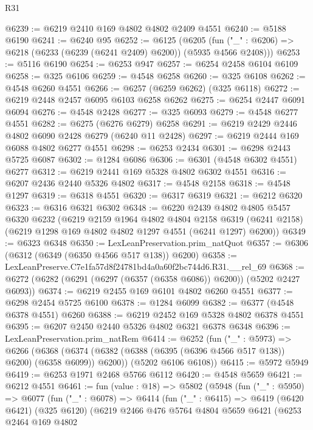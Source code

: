 \begin{lexlean}{R31}
\begin{coremodule}
@6239 := @6219 @2410 @169 @4802 @4802 @2409 @4551
@6240 := @5188 @6190
@6241 := @6240 @95
@6252 := @6125
    (@6205 (fun ("_" : @6206) => @6218 (@6233 (@6239 (@6241 @2409) @6200)) (@5935 @4566 @2408)))
@6253 := @5116 @6190
@6254 := @6253 @947
@6257 := @6254 @2458 @6104 @6109
@6258 := @325 @6106
@6259 := @4548 @6258
@6260 := @325 @6108
@6262 := @4548 @6260 @4551
@6266 := @6257 (@6259 @6262) (@325 @6118)
@6272 := @6219 @2448 @2457 @6095 @6103 @6258 @6262
@6275 := @6254 @2447 @6091 @6094
@6276 := @4548 @2428
@6277 := @325 @6093
@6279 := @4548 @6277 @4551
@6282 := @6275 (@6276 @6279) @6258
@6291 := @6219 @2429 @2446 @4802 @6090 @2428 @6279 (@6240 @11 @2428)
@6297 := @6219 @2444 @169 @6088 @4802 @6277 @4551
@6298 := @6253 @2434
@6301 := @6298 @2443 @5725 @6087
@6302 := @1284 @6086
@6306 := @6301 (@4548 @6302 @4551) @6277
@6312 := @6219 @2441 @169 @5328 @4802 @6302 @4551
@6316 := @6207 @2436 @2440 @5326 @4802
@6317 := @4548 @2158
@6318 := @4548 @1297
@6319 := @6318 @4551
@6320 := @6317 @6319
@6321 := @6212 @6320
@6323 := @6316 @6321 @6302
@6348 := @6220
    @2439
    @4802
    @4805
    @5457
    @6320
    @6232
    (@6219
      @2159
      @1964
      @4802
      @4804
      @2158
      @6319
      (@6241 @2158)
      (@6219 @1298 @169 @4802 @4802 @1297 @4551 (@6241 @1297) @6200))
@6349 := @6323 @6348
@6350 := LexLeanPreservation.prim_natQuot
@6357 := @6306 (@6312 (@6349 (@6350 @4566 @517 @138)) @6200)
@6358 := LexLeanPreserve.C7e1fa57d8f24781bd4a0a60f2bc744d6.R31.__rel_69
@6368 := @6272 (@6282 (@6291 (@6297 (@6357 (@6358 @6086)) @6200)) (@5202 @2427 @6093))
@6374 := @6219 @2455 @169 @6101 @4802 @6260 @4551
@6377 := @6298 @2454 @5725 @6100
@6378 := @1284 @6099
@6382 := @6377 (@4548 @6378 @4551) @6260
@6388 := @6219 @2452 @169 @5328 @4802 @6378 @4551
@6395 := @6207 @2450 @2440 @5326 @4802 @6321 @6378 @6348
@6396 := LexLeanPreservation.prim_natRem
@6414 := @6252
    (fun ("_" : @5973) =>
    @6266
      (@6368 (@6374 (@6382 (@6388 (@6395 (@6396 @4566 @517 @138)) @6200) (@6358 @6099)) @6200))
      (@5202 @6106 @6108))
@6415 := @5972 @5949
@6419 := @6253 @1971 @2468 @5766 @6112
@6420 := @4548 @5659
@6421 := @6212 @4551
@6461 := fun (value : @18) =>
  @5802
    (@5948
      (fun ("_" : @5950) =>
      @6077
        (fun ("_" : @6078) =>
        @6414
          (fun ("_" : @6415) =>
          @6419
            (@6420 @6421)
            (@325 @6120)
            (@6219
              @2466
              @476
              @5764
              @4804
              @5659
              @6421
              (@6253
                @2464
                @169
                @4802

\end{coremodule}
\end{lexlean}
